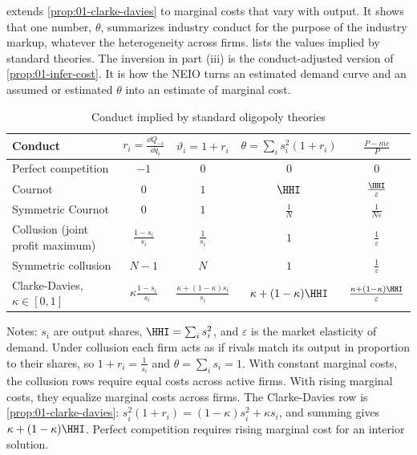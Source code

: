  extends \cref{prop:01-clarke-davies} to marginal costs that vary with output. It shows
that one number, $\theta$, summarizes industry conduct for the purpose of the industry markup, whatever the
heterogeneity across firms.  lists the values implied by standard theories. The
inversion in part (iii) is the conduct-adjusted version of \cref{prop:01-infer-cost}. It is how the NEIO turns an
estimated demand curve and an assumed or estimated $\theta$ into an estimate of marginal cost.

\begin{table}[htbp]
\centering
\begin{threeparttable}
\caption{Conduct implied by standard oligopoly theories}
\label{tab:01-conduct-menu}
\small
\renewcommand{\arraystretch}{1.45}
\begin{tabular}{@{}lcccc@{}}
\toprule
Conduct & $r_i = \frac{\dd Q_{-i}}{\dd q_i}$ & $\vartheta_i = 1 + r_i$ & $\theta = \sum_i s_i^2(1 + r_i)$
  & $\frac{P - \overline{mc}}{P}$ \\
\midrule
Perfect competition & $-1$ & $0$ & $0$ & $0$ \\
Cournot & $0$ & $1$ & $\HHI$ & $\frac{\HHI}{\varepsilon}$ \\
Symmetric Cournot & $0$ & $1$ & $\frac{1}{N}$ & $\frac{1}{N\varepsilon}$ \\
Collusion (joint profit maximum) & $\frac{1 - s_i}{s_i}$ & $\frac{1}{s_i}$ & $1$ & $\frac{1}{\varepsilon}$ \\
Symmetric collusion & $N - 1$ & $N$ & $1$ & $\frac{1}{\varepsilon}$ \\
Clarke-Davies, $\kappa \in [0, 1]$ & $\kappa\frac{1 - s_i}{s_i}$ & $\frac{\kappa + (1 - \kappa)s_i}{s_i}$
  & $\kappa + (1 - \kappa)\HHI$ & $\frac{\kappa + (1 - \kappa)\HHI}{\varepsilon}$ \\
\bottomrule
\end{tabular}
\begin{tablenotes}\footnotesize
\item Notes: $s_i$ are output shares, $\HHI = \sum_i s_i^2$, and $\varepsilon$ is the market elasticity of demand.
Under collusion each firm acts as if rivals match its output in proportion to their shares, so
$1 + r_i = \frac{1}{s_i}$ and $\theta = \sum_i s_i = 1$. With constant marginal costs, the collusion rows require
equal costs across active firms. With rising marginal costs, they equalize marginal costs across firms. The
Clarke-Davies row is
\cref{prop:01-clarke-davies}: $s_i^2(1 + r_i) = (1 - \kappa)s_i^2 + \kappa s_i$, and summing gives
$\kappa + (1 - \kappa)\HHI$. Perfect competition requires rising marginal cost for an interior solution.
\end{tablenotes}
\end{threeparttable}
\end{table}

